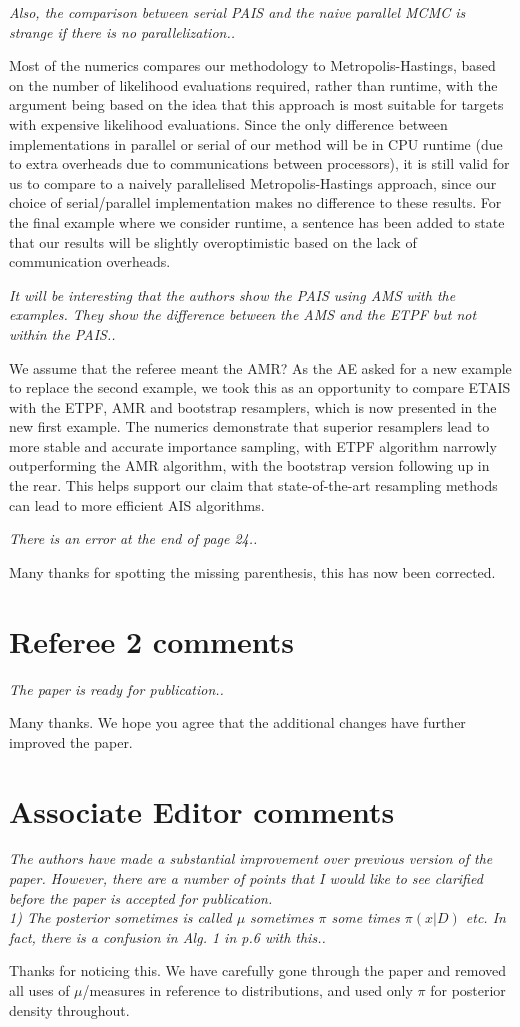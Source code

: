 \documentclass{article}
\newcommand{\comment}[2]{\vspace{0.6cm}{\bf Comment:} {\it #1.}

\vspace{0.3cm}{\bf Answer:} #2}
\begin{document}
\comment{Also, the comparison between serial PAIS and the naive parallel MCMC is strange if there is no parallelization.}{Most of the numerics compares our methodology to Metropolis-Hastings, based on the number of likelihood evaluations required, rather than runtime, with the argument being based on the idea that this approach is most suitable for targets with expensive likelihood evaluations. Since the only difference between implementations in parallel or serial of our method will be in CPU runtime (due to extra overheads due to communications between processors), it is still valid for us to compare to a naively parallelised Metropolis-Hastings approach, since our choice of serial/parallel implementation makes no difference to these results. For the final example where we consider runtime, a sentence has been added to state that our results will be slightly overoptimistic based on the lack of communication overheads.}

\comment{It will be interesting that the authors show the PAIS using AMS with the examples. They show the difference between the AMS and the ETPF but not within the PAIS.}{We assume that the referee meant the AMR? As the AE asked for a new example to replace the second example, we took this as an opportunity to compare ETAIS with the ETPF, AMR and bootstrap resamplers, which is now presented in the new first example. The numerics demonstrate that superior resamplers lead to more stable and accurate importance sampling, with ETPF algorithm narrowly outperforming the AMR algorithm, with the bootstrap version following up in the rear. This helps support our claim that state-of-the-art resampling methods can lead to more efficient AIS algorithms.}

\comment{There is an error at the end of page 24.}{Many thanks for spotting the missing parenthesis, this has now been corrected.}

\section*{Referee 2 comments}
\comment{The paper is ready for publication.}{Many thanks. We hope you agree that the additional changes have further improved the paper.}

\section*{Associate Editor comments}

\comment{The authors have made a substantial improvement over previous version of the paper. However, there are a number of points that I would like to see clarified before the paper is accepted for publication.\\
1) The posterior sometimes is called $\mu$ sometimes $\pi$ some times $\pi(x|D)$ etc. In fact, there is a confusion in Alg. 1 in p.6 with this.}{Thanks for noticing this. We have carefully gone through the paper and removed all uses of $\mu$/measures in reference to distributions, and used only $\pi$ for posterior density throughout.}
\end{document}
